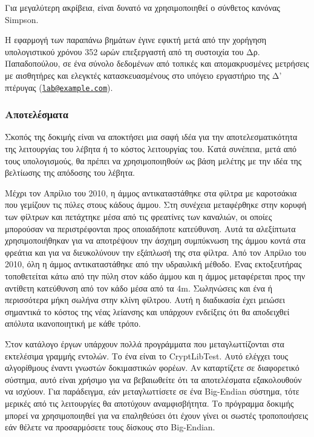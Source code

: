 \documentclass[12pt,a4paper]{extarticle}
\begin{document}
Για μεγαλύτερη ακρίβεια, είναι δυνατό να χρησιμοποιηθεί ο σύνθετος κανόνας Simpson.

Η εφαρμογή των παραπάνω βημάτων έγινε εφικτή μετά από την χορήγηση υπολογιστικού χρόνου 352 ωρών επεξεργαστή από τη συστοιχία του Δρ. Παπαδοπούλου, σε ένα σύνολο
δεδομένων από τοπικές και απομακρυσμένες μετρήσεις με αισθητήρες και ελεγκτές κατασκευασμένους στο υπόγειο εργαστήριο της Δ' πτέρυγας (\href{mailto:lab@example.com}{\texttt{lab@example.com}}).

\subsubsection{Αποτελέσματα}
Σκοπός της δοκιμής είναι να αποκτήσει μια σαφή ιδέα για την αποτελεσματικότητα της λειτουργίας του λέβητα ή το κόστος λειτουργίας του. Κατά συνέπεια, μετά από τους υπολογισμούς, θα πρέπει να χρησιμοποιηθούν ως βάση μελέτης με την ιδέα της βελτίωσης της απόδοσης του λέβητα.

Μέχρι τον Απρίλιο του 2010, η άμμος αντικαταστάθηκε στα φίλτρα με καροτσάκια που γεμίζουν τις πύλες στους κάδους άμμου. Στη συνέχεια μεταφέρθηκε στην κορυφή των φίλτρων και πετάχτηκε μέσα από τις φρεατίνες των καναλιών, οι οποίες μπορούσαν να περιστρέφονται προς οποιαδήποτε κατεύθυνση. Αυτά τα αλεξίπτωτα χρησιμοποιήθηκαν για να αποτρέψουν την άσχημη συμπύκνωση της άμμου κοντά στα φρεάτια και για να διευκολύνουν την εξάπλωσή της στα φίλτρα. Από τον Απρίλιο του 2010, όλη η άμμος αντικαταστάθηκε από την υδραυλική μέθοδο. Ένας εκτοξευτήρας τοποθετείται κάτω από την πύλη στον κάδο άμμου και η άμμος μεταφέρεται προς την αντίθετη κατεύθυνση από τον κάδο μέσα από τα 4m. Σωληνώσεις και ένα ή περισσότερα μήκη σωλήνα στην κλίνη φίλτρου. Αυτή η διαδικασία έχει μειώσει σημαντικά το κόστος της νέας λείανσης και υπάρχουν ενδείξεις ότι θα αποδειχθεί απόλυτα ικανοποιητική με κάθε τρόπο.

Στον κατάλογο έργων υπάρχουν πολλά προγράμματα που μεταγλωττίζονται στα εκτελέσιμα γραμμής εντολών. Το ένα είναι το CryptLibTest. Αυτό ελέγχει τους αλγορίθμους έναντι γνωστών δοκιμαστικών φορέων. Αν καταρτίζετε σε διαφορετικό σύστημα, αυτό είναι χρήσιμο για να βεβαιωθείτε ότι τα αποτελέσματα εξακολουθούν να ισχύουν. Για παράδειγμα, εάν μεταγλωττίσετε σε ένα Big-Endian σύστημα, τότε μερικές από τις λειτουργίες θα αποτύχουν αναμφισβήτητα. Το πρόγραμμα δοκιμής μπορεί να χρησιμοποιηθεί για να επαληθεύσει ότι έχουν γίνει οι σωστές τροποποιήσεις εάν θέλετε να προσαρμόσετε τους δίσκους στο Big-Endian.

\theendnotes
\end{document}
